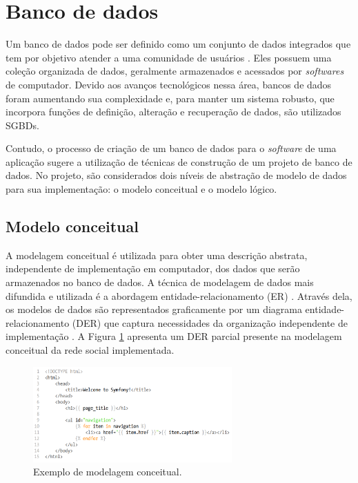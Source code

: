 \section{Banco de dados}
\label{fundBD}

Um banco de dados pode ser definido como um conjunto de dados integrados que tem por objetivo atender a uma comunidade de usuários \cite{heuser}. Eles possuem uma coleção organizada de dados, geralmente armazenados e acessados por \textit{softwares} de computador. Devido aos avanços tecnológicos nessa área, bancos de dados foram aumentando sua complexidade e, para manter um sistema robusto, que incorpora funções de definição, alteração e recuperação de dados, são utilizados SGBDs.

Contudo, o processo de criação de um banco de dados para o \textit{software} de uma aplicação sugere a utilização de técnicas de construção de um projeto de banco de dados. No projeto, são considerados dois níveis de abstração de modelo de dados para sua implementação: o modelo conceitual e o modelo lógico.

\subsection{Modelo conceitual}
\label{fundBDModelagem}

A modelagem conceitual é utilizada para obter uma descrição abstrata, independente de implementação em computador, dos dados que serão armazenados no banco de dados. A técnica de modelagem de dados mais difundida e utilizada é a abordagem entidade-relacionamento (ER) \cite{heuser}. Através dela, os modelos de dados são representados graficamente por um diagrama entidade-relacionamento (DER) que captura necessidades da organização independente de implementação \cite{peterChen1976}. A Figura \ref{modelagemBDExemplol} apresenta um DER parcial presente na modelagem conceitual da rede social implementada.

\begin{figure}[h]
    \caption{Exemplo de modelagem conceitual.}
       	\begin{center}
            \includegraphics[width=0.68\textwidth]{figuras/twig-symf.png}
        \end{center}
    \label{modelagemBDExemplol}
\end{figure}

